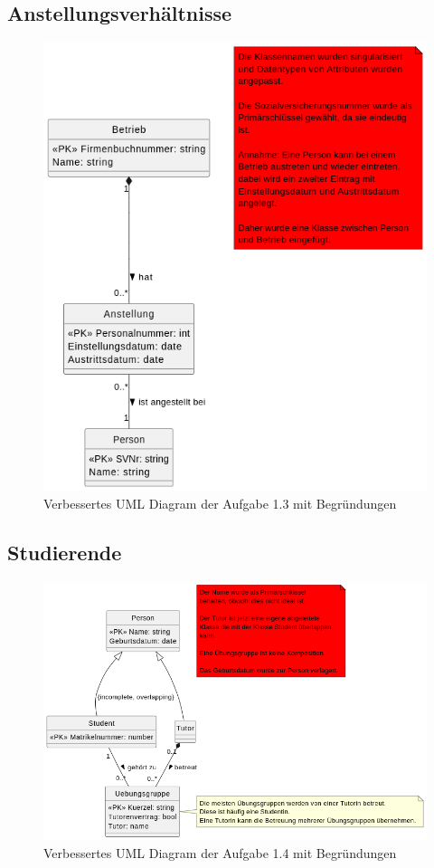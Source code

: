 \documentclass[12pt]{scrartcl}
\begin{document}
\subsection{Anstellungsverhältnisse}
\begin{figure}[ht]
    \centering
    \includegraphics[width=0.9\linewidth]{../UE1_1_3.png}
    \caption{Verbessertes UML Diagram der Aufgabe 1.3 mit Begründungen}
\end{figure}
\pagebreak
\subsection{Studierende}
\begin{figure}[ht]
    \centering
    \includegraphics[width=0.9\linewidth]{../UE1_1_4.png}
    \caption{Verbessertes UML Diagram der Aufgabe 1.4 mit Begründungen}
\end{figure}
\pagebreak
\end{document}
